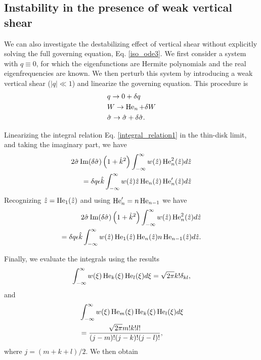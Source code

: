 \subsection{Instability in the presence of weak vertical shear}
We can also investigate the destabilizing effect of vertical shear
without explicitly solving the full governing equation,
Eq. \ref{iso_ode3}. We first
consider a system with $q\equiv0$, for which the eigenfunctions are
Hermite polynomials and the real eigenfrequencies are known. We then
perturb this system by introducing a weak vertical shear ($|q|\ll1$)
and linearize the governing equation. This procedure is
\begin{align}   
  &q \to 0 + \delta q\\
  &W \to \operatorname{He}_n + \delta W \\
  &\hat{\sigma} \to \hat{\sigma} + \delta\hat{\sigma}. 
\end{align}

Linearizing the integral relation Eq. \ref{integral_relation1} in the
thin-disk limit, and taking the
imaginary part, we have
\begin{align}
  2\hat{\sigma}\operatorname{Im}(\delta\hat{\sigma})
  \left(1+\hat{k}^2\right) \int_{-\infty}^{\infty} w(\hat{z})
  \operatorname{He}_n^2(\hat{z}) d\hat{z} \notag\\
  = \delta q \epsilon \hat{k} 
  \int_{-\infty}^{\infty}
  w(\hat{z})\hat{z}\operatorname{He}_n(\hat{z})\operatorname{He}_n^\prime(\hat{z}) d\hat{z}
\end{align}
Recognizing $\hat{z} = \operatorname{He}_1(\hat{z})$ and using $\operatorname{He}_n^\prime = n
\operatorname{He}_{n-1}$ we have
 \begin{align}
   2\hat{\sigma}\operatorname{Im}(\delta\hat{\sigma})
   \left(1+\hat{k}^2\right) \int_{-\infty}^{\infty} w(\hat{z})
   \operatorname{He}_n^2(\hat{z}) d\hat{z} \notag\\
   =\delta q \epsilon \hat{k} 
   \int_{-\infty}^{\infty}
   w(\hat{z})\operatorname{He}_1(\hat{z})\operatorname{He}_n(\hat{z})n\operatorname{He}_{n-1}(\hat{z})d\hat{z}. 
 \end{align}

Finally, we evaluate the integrals using the results
\begin{align}
  \int_{-\infty}^{\infty}
  w(\xi) \operatorname{He}_k(\xi)\operatorname{He}_l(\xi) d\xi = \sqrt{2\pi}k!\delta_{kl}, 
\end{align}
and
\begin{align}
  &\int_{-\infty}^{\infty}
  w(\xi) \operatorname{He}_m(\xi)\operatorname{He}_k(\xi)\operatorname{He}_l(\xi) d\xi\notag\\& =
  \frac{\sqrt{2\pi}m!k!l!}{(j-m)!(j-k)!(j-l)!}, 
\end{align}
where $j = (m+k+l)/2$. We then obtain

